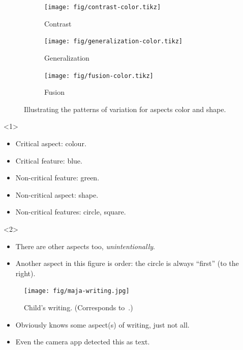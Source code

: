 \begin{frame}
  \begin{figure}
    \begin{subfigure}{0.3\columnwidth}
      \centering
      \texttt{[image: fig/contrast-color.tikz]}
      \caption{Contrast}
    \end{subfigure}
    \hfill
    \begin{subfigure}{0.3\columnwidth}
      \centering
      \texttt{[image: fig/generalization-color.tikz]}
      \caption{Generalization}
    \end{subfigure}
    \hfill
    \begin{subfigure}{0.3\columnwidth}
      \centering
      \texttt{[image: fig/fusion-color.tikz]}
      \caption{Fusion}
    \end{subfigure}
    \caption{%
      Illustrating the patterns of variation for aspects color and shape.
    }
  \end{figure}

  \begin{onlyenv}<1>
    \begin{example}
      \begin{itemize}
        \item Critical aspect: colour.
        \item Critical feature: blue.
        \item Non-critical feature: green.
        \item Non-critical aspect: shape.
        \item Non-critical features: circle, square.
      \end{itemize}
    \end{example}
  \end{onlyenv}
  \begin{onlyenv}<2>
    \begin{remark}
      \begin{itemize}
        \item There are other aspects too, \emph{unintentionally}.
        \item Another aspect in this figure is order: the circle is always 
          \enquote{first} (to the right).
      \end{itemize}
    \end{remark}
  \end{onlyenv}
\end{frame}

\begin{frame}
  \begin{figure}
    \texttt{[image: fig/maja-writing.jpg]}
    \caption{Child's writing.
      (Corresponds to~\cite[Fig.~2.1, p.~30]{NecessaryConditionsOfLearning}.)
    }
  \end{figure}
  \begin{example}
    \begin{itemize}
      \item Obviously knows some aspect(s) of writing, just not all.
      \item Even the camera app detected this as text.
    \end{itemize}
  \end{example}
\end{frame}

